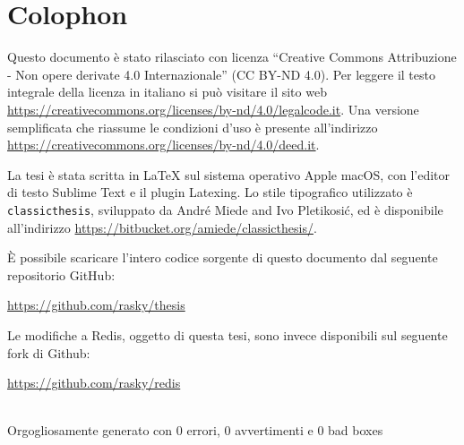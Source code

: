 \pagestyle{empty}

\hfill

\vfill


\section*{Colophon}

Questo documento è stato rilasciato con licenza ``Creative Commons Attribuzione
- Non opere derivate 4.0 Internazionale'' (CC BY-ND 4.0). Per leggere il testo
integrale della licenza in italiano si può visitare il sito web
\url{https://creativecommons.org/licenses/by-nd/4.0/legalcode.it}. Una versione
semplificata che riassume le condizioni d'uso è presente all'indirizzo
\url{https://creativecommons.org/licenses/by-nd/4.0/deed.it}.

La tesi è stata scritta in \LaTeX{} sul sistema operativo Apple macOS, con
l'editor di testo Sublime Text e il plugin Latexing. Lo stile tipografico
utilizzato è \texttt{classicthesis}, sviluppato da Andr\'e Miede and Ivo
Pletikosić, ed è disponibile all'indirizzo
\url{https://bitbucket.org/amiede/classicthesis/}.

È possibile scaricare l'intero codice sorgente di questo documento dal 
seguente repositorio GitHub:
\begin{center}
\url{https://github.com/rasky/thesis}
\end{center}

Le modifiche a Redis, oggetto di questa tesi, sono invece disponibili sul 
seguente fork di Github:
\begin{center}
\url{https://github.com/rasky/redis}
\end{center}

\bigskip
\bigskip

\footnotesize
\noindent\finalVersionString \\
\noindent Orgogliosamente generato con $0$ errori, $0$ avvertimenti e $0$ bad boxes


